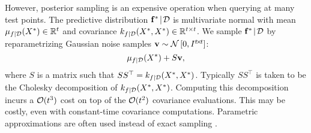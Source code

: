 However, posterior sampling is an expensive operation when querying at many test points.
The predictive distribution $\mathbf{f}^* \! \mid \! \mathcal D$ is multivariate normal with mean $\mu_{f \mid \mathcal D} (X^*) \in \mathbb{R}^t$ and covariance $k_{f \mid \mathcal D} (X^*, X^*) \in \mathbb{R}^{t \times t}$.
We sample $\mathbf{f}^* \! \mid \! \mathcal D$ by reparametrizing Gaussian noise samples $\mathbf{v} \sim \mathcal{N} \left[ 0, I{}^{t\!\times \!t} \right]$:
%
\begin{equation}
  \mu_{f \mid \mathcal D} (X^*) + S \mathbf{v},
  \label{eq:sample}
\end{equation}
%
where $S$ is a matrix such that $S S^\top = k_{f \mid \mathcal D} (X^*, X^*)$.
Typically $S S^\top$ is taken to be the Cholesky decomposition of $k_{f \mid \mathcal D} (X^*, X^*)$.
Computing this decomposition incurs a $\bigo{t^3}$ cost on top of the $\bigo{t^2}$ covariance evaluations.
This may be costly, even with constant-time covariance computations.
Parametric approximations are often used instead of exact sampling \cite{deisenroth2011pilco}.


